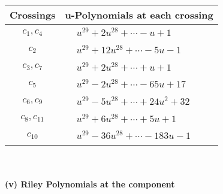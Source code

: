 \documentclass[1p]{elsarticle_modified}
\theoremstyle{definition}
\begin{document}
\begin{tabular}{m{50pt}|m{274pt}}
Crossings & \hspace{64pt}u-Polynomials at each crossing \\
\hline $$\begin{aligned}c_{1},c_{4}\end{aligned}$$&$\begin{aligned}
&u^{29}+2 u^{28}+\cdots- u+1
\end{aligned}$\\
\hline $$\begin{aligned}c_{2}\end{aligned}$$&$\begin{aligned}
&u^{29}+12 u^{28}+\cdots-5 u-1
\end{aligned}$\\
\hline $$\begin{aligned}c_{3},c_{7}\end{aligned}$$&$\begin{aligned}
&u^{29}+2 u^{28}+\cdots+u+1
\end{aligned}$\\
\hline $$\begin{aligned}c_{5}\end{aligned}$$&$\begin{aligned}
&u^{29}-2 u^{28}+\cdots-65 u+17
\end{aligned}$\\
\hline $$\begin{aligned}c_{6},c_{9}\end{aligned}$$&$\begin{aligned}
&u^{29}-5 u^{28}+\cdots+24 u^2+32
\end{aligned}$\\
\hline $$\begin{aligned}c_{8},c_{11}\end{aligned}$$&$\begin{aligned}
&u^{29}+6 u^{28}+\cdots+5 u+1
\end{aligned}$\\
\hline $$\begin{aligned}c_{10}\end{aligned}$$&$\begin{aligned}
&u^{29}-36 u^{28}+\cdots-183 u-1
\end{aligned}$\\
\hline
\end{tabular}\\~\\
\newpage\renewcommand{\arraystretch}{1}
\flushleft \textbf{(v) Riley Polynomials at the component}\newline \\
\end{document}
